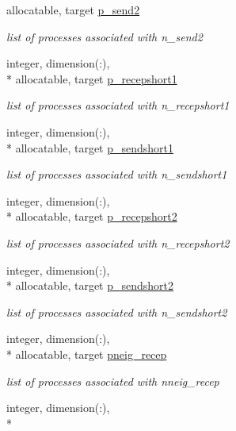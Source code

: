 \begin{DoxyCompactItemize}
allocatable, target \hyperlink{classdomdec_a8323226a166ccbe0958fcb23e40e8ea3}{p\-\_\-send2}
\begin{DoxyCompactList}\small\item\em list of processes associated with n\-\_\-send2 \end{DoxyCompactList}\item 
integer, dimension(\-:), \\*
allocatable, target \hyperlink{classdomdec_a1dfc2e20e70c2f2071d5426210da1ed8}{p\-\_\-recepshort1}
\begin{DoxyCompactList}\small\item\em list of processes associated with n\-\_\-recepshort1 \end{DoxyCompactList}\item 
integer, dimension(\-:), \\*
allocatable, target \hyperlink{classdomdec_a1160480c1dedc45c50370302ac8df4cb}{p\-\_\-sendshort1}
\begin{DoxyCompactList}\small\item\em list of processes associated with n\-\_\-sendshort1 \end{DoxyCompactList}\item 
integer, dimension(\-:), \\*
allocatable, target \hyperlink{classdomdec_a1ca125848ba21ab0b69170dbb7b55a06}{p\-\_\-recepshort2}
\begin{DoxyCompactList}\small\item\em list of processes associated with n\-\_\-recepshort2 \end{DoxyCompactList}\item 
integer, dimension(\-:), \\*
allocatable, target \hyperlink{classdomdec_a4307c5b3e7ed134c6ff12f02074a1841}{p\-\_\-sendshort2}
\begin{DoxyCompactList}\small\item\em list of processes associated with n\-\_\-sendshort2 \end{DoxyCompactList}\item 
integer, dimension(\-:), \\*
allocatable, target \hyperlink{classdomdec_a720905850ac4cc7d180e0b6eb9a32c5d}{pneig\-\_\-recep}
\begin{DoxyCompactList}\small\item\em list of processes associated with nneig\-\_\-recep \end{DoxyCompactList}\item 
integer, dimension(\-:), \\*

\end{DoxyCompactItemize}
